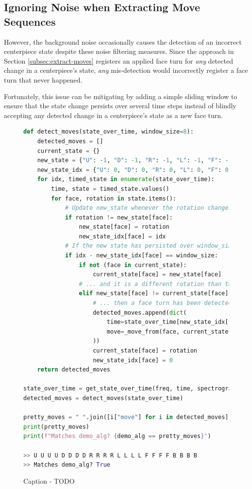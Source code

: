 \newpage
\subsection{Ignoring Noise when Extracting Move Sequences}
\label{subsec:ignoring-noise-when-extracting-move-sequences}
However, the background noise occasionally causes the detection of an incorrect centerpiece state despite these noise filtering measures.
Since the approach in Section \ref{subsec:extract-moves} registers an applied face turn for \emph{any} detected change in a centerpiece's state, \emph{any} mis-detection would incorrectly register a face turn that never happened.

Fortunately, this issue can be mitigating by adding a simple sliding window to ensure that the state change persists over several time steps instead of blindly accepting any detected change in a centerpiece's state as a new face turn.

\begin{figure}[h]
\begin{lstlisting}[language=Python]
def detect_moves(state_over_time, window_size=8):                       # Edit
    detected_moves = []
    current_state = {}
    new_state = {"U": -1, "D": -1, "R": -1, "L": -1, "F": -1, "B": -1}  # New
    new_state_idx = {"U": 0, "D": 0, "R": 0, "L": 0, "F": 0, "B": 0}    # New
    for idx, timed_state in enumerate(state_over_time):
        time, state = timed_state.values()
        for face, rotation in state.items():
            # Update new_state whenever the rotation changes
            if rotation != new_state[face]:
                new_state[face] = rotation
                new_state_idx[face] = idx
            # If the new state has persisted over window_size time steps...
            if idx - new_state_idx[face] == window_size:
                if not (face in current_state):
                    current_state[face] = new_state[face]
                # ... and it is a different rotation than the current state...
                elif new_state[face] != current_state[face]:
                    # ... then a face turn has been detected!
                    detected_moves.append(dict(
                        time=state_over_time[new_state_idx[face]]["time"],
                        move=_move_from(face, current_state[face], rotation)
                    ))
                    current_state[face] = rotation
                    new_state_idx[face] = 0
    return detected_moves

state_over_time = get_state_over_time(freq, time, spectrogram)
detected_moves = detect_moves(state_over_time)

pretty_moves = " ".join([i["move"] for i in detected_moves])
print(pretty_moves)   
print(f"Matches demo_alg? {demo_alg == pretty_moves}")

>> U U U U D D D D R R R R L L L L F F F F B B B B
>> Matches demo_alg? True
\end{lstlisting}
\caption{Caption - TODO}
\label{fig:todo}
\end{figure}

